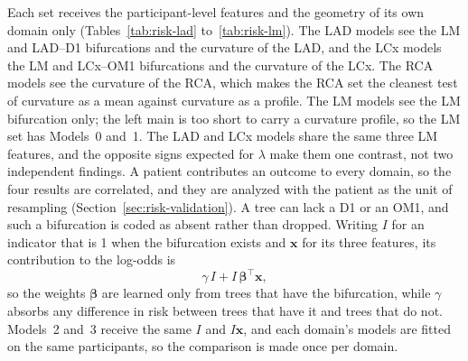 Each set receives the participant-level features and the geometry of its own domain only (Tables~\ref{tab:risk-lad} to~\ref{tab:risk-lm}).
The LAD models see the LM and LAD--D1 bifurcations and the curvature of the LAD, and the LCx models the LM and LCx--OM1 bifurcations and the curvature of the LCx.
The RCA models see the curvature of the RCA, which makes the RCA set the cleanest test of curvature as a mean against curvature as a profile.
The LM models see the LM bifurcation only; the left main is too short to carry a curvature profile, so the LM set has Models~0 and~1.
The LAD and LCx models share the same three LM features, and the opposite signs expected for $\lambda$ make them one contrast, not two independent findings.
A patient contributes an outcome to every domain, so the four results are correlated, and they are analyzed with the patient as the unit of resampling (Section~\ref{sec:risk-validation}).
A tree can lack a D1 or an OM1, and such a bifurcation is coded as absent rather than dropped.
Writing $I$ for an indicator that is 1 when the bifurcation exists and $\mathbf{x}$ for its three features, its contribution to the log-odds is
\begin{equation}
  \gamma\, I + I \, \boldsymbol{\beta}^{\top} \mathbf{x},
  \label{eq:risk-presence}
\end{equation}
so the weights $\boldsymbol{\beta}$ are learned only from trees that have the bifurcation, while $\gamma$ absorbs any difference in risk between trees that have it and trees that do not.
Models~2 and~3 receive the same $I$ and $I\mathbf{x}$, and each domain's models are fitted on the same participants, so the comparison is made once per domain.


